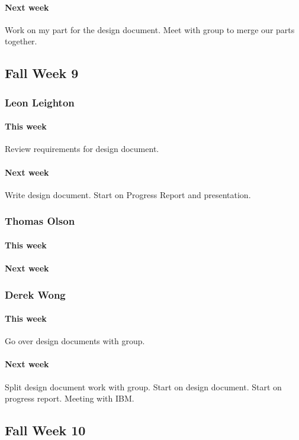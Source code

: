 \documentclass[10pt,letterpaper,onecolumn,draftclsnofoot]{IEEEtran}
\begin{document}
\paragraph{Next week}Work on my part for the design document.                       
Meet with group to merge our parts together.

\subsection{Fall Week 9}
\subsubsection{Leon Leighton}
\paragraph{This week}Review requirements for design document.
\paragraph{Next week}Write design document. Start on Progress Report and presentation.

\subsubsection{Thomas Olson}
\paragraph{This week}
\paragraph{Next week}

\subsubsection{Derek Wong}
\paragraph{This week}Go over design documents with group.
\paragraph{Next week}Split design document work with group.                  
Start on design document.                
Start on progress report.             
Meeting with IBM.

\subsection{Fall Week 10}
\end{document}
